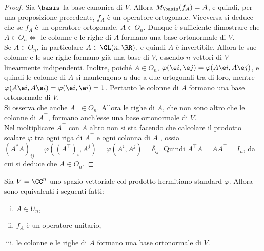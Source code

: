 \begin{proof}
	Sia $\basis$ la base canonica di $V$. Allora $M_\basis(f_A) = A$, e quindi, per una proposizione
	precedente, $f_A$ è un operatore ortogonale. Viceversa si deduce che se $f_A$ è un operatore ortogonale,
	$A \in O_n$. Dunque è sufficiente dimostrare che $A \in O_n \iff$ le colonne e le righe di $A$ formano una
	base ortonormale di $V$. \\
	
	\rightproof Se $A \in O_n$, in particolare $A \in \GL(n, \RR)$, e quindi $A$ è invertibile. Allora le
	sue colonne e le sue righe formano già una base di $V$, essendo $n$ vettori di $V$ linearmente indipendenti.
	Inoltre, poiché $A \in O_n$, $\varphi(\e i, \e j) = \varphi(A \e i, A \e j)$, e quindi le colonne di $A$ si mantengono a due a due ortogonali tra di loro, mentre $\varphi(A \e i, A \e i) = \varphi(\e i, \e i) = 1$.
	Pertanto le colonne di $A$ formano una base ortonormale di $V$. \\
	
	Si osserva che anche $A^\top \in O_n$. Allora le righe di $A$, che non sono altro che
	le colonne di $A^\top$, formano anch'esse una base ortonormale di $V$. \\
	
	\leftproof Nel moltiplicare $A^\top$ con $A$ altro non si sta facendo che calcolare il prodotto
	scalare $\varphi$ tra ogni riga di $A^\top$ e ogni colonna di $A$	, ossia $(A^* A)_{ij} = \varphi((A^\top)_i, A^j) = \varphi(A^i, A^j) = \delta_{ij}$.
	Quindi $A^\top A = A A^\top = I_n$, da cui si deduce che $A \in O_n$.
\end{proof}

\begin{proposition}
	Sia $V = \CC^n$ uno spazio vettoriale col prodotto hermitiano standard $\varphi$. Allora sono equivalenti i seguenti fatti:
	
	\begin{enumerate}[(i)]
		\item $A \in U_n$,
		\item $f_A$ è un operatore unitario,
		\item le colonne e le righe di $A$ formano una base ortonormale di $V$.
	\end{enumerate}
\end{proposition}

